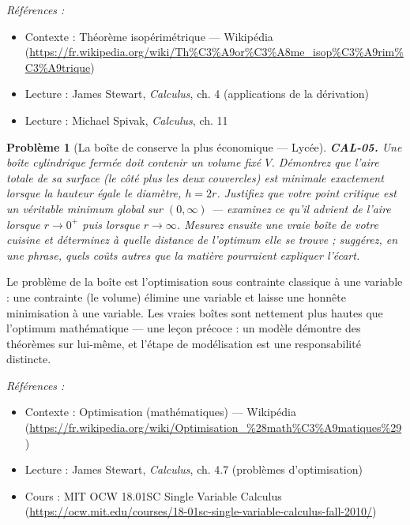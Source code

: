 \documentclass[11pt]{article}
\newtheorem{problem}{Problème}
\newenvironment{refs}{\par\small\noindent\emph{Références :}\begin{itemize}\setlength\itemsep{0pt}}{\end{itemize}\normalsize}
\begin{document}
\begin{refs}
\item Contexte : Théorème isopérimétrique --- Wikipédia (\url{https://fr.wikipedia.org/wiki/Th%C3%A9or%C3%A8me_isop%C3%A9rim%C3%A9trique})
\item Lecture : James Stewart, \textit{Calculus}, ch. 4 (applications de la dérivation)
\item Lecture : Michael Spivak, \textit{Calculus}, ch. 11
\end{refs}

\bigskip

\begin{problem}[{La boîte de conserve la plus économique --- Lycée}]
\textbf{CAL-05.} Une boîte cylindrique fermée doit contenir un volume fixé
$ V $. Démontrez que l'aire totale de sa surface (le côté plus les deux couvercles) est minimale exactement lorsque
la hauteur égale le diamètre, $ h = 2r $. Justifiez que votre point critique est un véritable
minimum global sur $ (0,\infty) $ --- examinez ce qu'il advient de l'aire lorsque $ r\to 0^+ $
puis lorsque $ r\to\infty $. Mesurez ensuite une vraie boîte de votre cuisine et déterminez à quelle distance
de l'optimum elle se trouve ; suggérez, en une phrase, quels coûts autres que la matière pourraient expliquer
l'écart.
\end{problem}

\noindent Le problème de la boîte est l'optimisation sous contrainte classique à une variable :
une contrainte (le volume) élimine une variable et laisse une honnête minimisation à une
variable. Les vraies boîtes sont nettement plus hautes que l'optimum mathématique --- une leçon précoce :
un modèle démontre des théorèmes sur lui-même, et l'étape de modélisation est une responsabilité
distincte.

\begin{refs}
\item Contexte : Optimisation (mathématiques) --- Wikipédia (\url{https://fr.wikipedia.org/wiki/Optimisation_%28math%C3%A9matiques%29})
\item Lecture : James Stewart, \textit{Calculus}, ch. 4.7 (problèmes d'optimisation)
\item Cours : MIT OCW 18.01SC Single Variable Calculus (\url{https://ocw.mit.edu/courses/18-01sc-single-variable-calculus-fall-2010/})
\end{refs}

\bigskip
\end{document}
